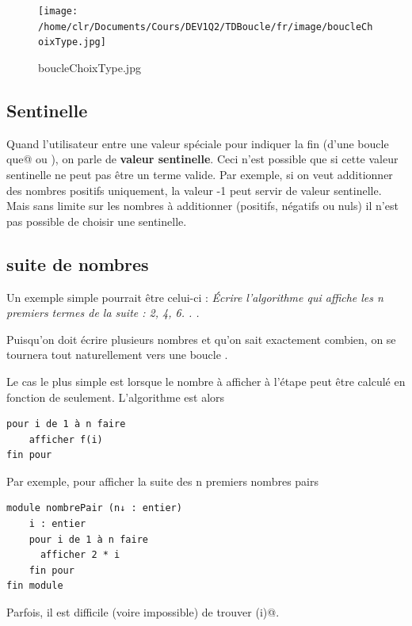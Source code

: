 \documentclass[11pt,a4paper]{article}
\begin{document}
            \par
        \begin{figure}[hbt]
				    \begin{center}
					\texttt{[image: /home/clr/Documents/Cours/DEV1Q2/TDBoucle/fr/image/boucleChoixType.jpg]}
						\end{center}
                
                    \caption[boucleChoixType.jpg]{boucleChoixType.jpg}
                \end{figure}
                    
            \par
        \subsection{Sentinelle}
      Quand l'utilisateur entre une valeur sp\'eciale pour indiquer la fin 
      (d'une boucle \verb@tant que@ ou \verb@faire@), 
      on parle de\textbf{ valeur sentinelle}.
      Ceci n'est possible que si cette valeur sentinelle ne peut pas \^etre un terme valide. 
      Par exemple, si on veut additionner des nombres positifs uniquement, la valeur -1 peut
      servir de valeur sentinelle. Mais sans limite sur les nombres \`a additionner (positifs, n\'egatifs
      ou nuls) il n'est pas possible de choisir une sentinelle.
    \subsection{suite de nombres}
		    Un exemple simple pourrait \^etre celui-ci : 
		    \guillemotleft  \textit{\'Ecrire l'algorithme qui affiche les n premiers
        termes de la suite : 2, 4, 6. . . }\guillemotright 
      
            \par
        
        Puisqu'on doit \'ecrire plusieurs nombres et qu'on sait exactement combien, 
        on se tournera tout naturellement vers une boucle \verb@pour@.
      
            \par
        
        Le cas le plus simple est lorsque le nombre \`a afficher \`a l'\'etape \verb@i@ 
        peut \^etre calcul\'e en fonction de \verb@i@ seulement. L'algorithme est alors
      
            \par
        \begin{verbatim}
pour i de 1 à n faire
    afficher f(i)
fin pour
      \end{verbatim}Par exemple, pour afficher la suite des n premiers nombres pairs
            \par
        \begin{verbatim}
module nombrePair (n↓ : entier)
    i : entier
    pour i de 1 à n faire
      afficher 2 * i
    fin pour
fin module
      \end{verbatim}
        Parfois, il est difficile (voire impossible) de trouver \verb@f(i)@.\par
				
\end{document}
